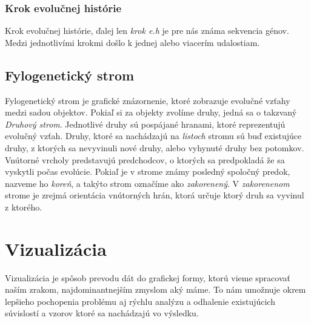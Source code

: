 \subsubsection{Krok evolučnej histórie}
Krok evolučnej histórie, ďalej len \emph{krok e.h} je pre nás známa sekvencia génov. 
Medzi jednotlivími krokmi došlo k jednej alebo viacerím udalostiam. 

\subsection{Fylogenetický strom}
Fylogenetický strom je grafické znázornenie, ktoré zobrazuje evolučné vzťahy medzi sadou objektov. Pokiaľ si za objekty zvolíme druhy, jedná sa o takzvaný \emph{Druhový strom}.
Jednotlivé druhy sú pospájané hranami, ktoré reprezentujú evolučný vzťah.
\newline 
Druhy, ktoré sa nachádzajú na \emph{listoch} stromu sú buď existujúce druhy, z ktorých sa nevyvinuli nové druhy, alebo vyhynuté druhy bez potomkov.  
\newline
Vnútorné vrcholy predstavujú predchodcov, o ktorých sa predpokladá že sa vyskytli počas evolúcie.
\newline
Pokiaľ je v strome známy posledný spoločný predok, nazveme ho \emph{koreň}, a takýto strom označíme ako \emph{zakorenený}.
\newline
V \emph{zakorenenom} strome je zrejmá orientácia vnútorných hrán, ktorá určuje ktorý druh sa vyvinul z ktorého.
\section{Vizualizácia}
Vizualizácia je spôsob prevodu dát do grafickej formy, ktorú vieme spracovať naším zrakom, najdominantnejším zmyslom aký máme.
To nám umožnuje okrem lepšieho pochopenia problému aj rýchlu analýzu a odhalenie existujúcich súvislostí a vzorov ktoré sa nachádzajú vo výsledku.
